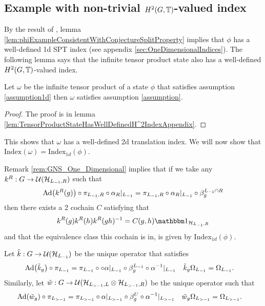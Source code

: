 \documentclass[11pt,a4paper,twoside]{article}
\numberwithin{equation}{section}
\begin{document}
	\subsection{Example with non-trivial $H^2(G,\mathbb T)$-valued index}\label{sec:ExampleOneTranslation}
	By the result of \cite{ogata2019classification}, lemma \ref{lem:phiExampleConsistentWithConjectureSplitProperty} implies that $\phi$ has a well-defined 1d SPT index (see appendix \ref{sec:OneDimensionalIndices}).  The following lemma says that the infinite tensor product state also has a well-defined $H^2(G,\mathbb T)$-valued index.
	\begin{lemma}\label{lem:TensorProductStateHasWellDefinedH^2Index}
		Let $\omega$ be the infinite tensor product of a state $\phi$ that satisfies assumption \ref{assumption1d} then $\omega$ satisfies assumption \ref{assumption}.
	\end{lemma}
	\begin{proof}
		The proof is in lemma \ref{lem:TensorProductStateHasWellDefinedH^2IndexAppendix}.
	\end{proof}
	This shows that $\omega$ has a well-defined 2d translation index. We will now show that $\textrm{Index}(\omega)=\textrm{Index}_{1d}(\phi)$.
	\begin{remark}
		Remark \ref{rem:GNS_One_Dimensional} implies that if we take any $k^R:G\rightarrow \mathcal U(\mathcal H_{L_{-1},R})$ such that
		\begin{equation}
			\Ad{k^R(g)}\circ\pi_{L_{-1},R}\circ\alpha_R|_{L_{-1}}=\pi_{L_{-1},R}\circ\alpha_R|_{L_{-1}}\circ\beta_{g}^{L_{-1}\cap R}
		\end{equation}
		then there exists a 2 cochain $C$ satisfying that
		\begin{equation}
			k^R(g)k^R(h)k^R(gh)^{-1}=C(g,h)\id_{\HH_{L_{-1},R}}
		\end{equation}
		and that the equivalence class this cochain is in, is given by $\textrm{Index}_{1d}(\phi)$.
	\end{remark}
	Let $\tilde k:G\rightarrow \mathcal U(\mathcal H_{L_{-1}})$ be the unique operator that satisfies
	\begin{align}
		\Ad{\tilde{k}_g}\circ\pi_{L_{-1}}&=\pi_{L_{-1}}\circ \circ\alpha|_{L_{-1}}\circ\beta_g^{L_{-1}}\circ \alpha^{-1}|_{L_{-1}}&\tilde k_g\Omega_{L_{-1}}&=\Omega_{L_{-1}}.
	\end{align}
	Similarly, let $\tilde{w}:G\rightarrow\mathcal U(\mathcal H_{L_{>-1},L}\otimes\mathcal H_{L_{>-1},R})$ be the unique operator such that
	\begin{align}
		\Ad{\tilde w_{g}}\circ\pi_{L_{>-1}}&=\pi_{L_{>-1}}\circ\alpha|_{L_{>-1}}\circ\beta_g^{U}\circ \alpha^{-1}|_{L_{>-1}}&\tilde w_{g}\Omega_{L_{>-1}}&=\Omega_{L_{>-1}}.
	\end{align}
\end{document}
